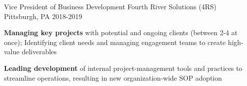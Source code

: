 \begin{cventries}
\cventry
    {Vice President of Business Development} %
    {Fourth River Solutions (4RS)} %
    {Pittsburgh, PA} %
    {2018-2019} %
    {
      \begin{cvitems} %
        \item {\textbf{Managing key projects} with potential and ongoing clients (between 2-4 at once); Identifying client needs and managing engagement teams to create high-value deliverables}
        \item {\textbf{Leading development} of internal project-management tools and practices to streamline operations, resulting in new organization-wide SOP adoption} 
      \end{cvitems}
    }
    \vspace*{-0.2cm}

\end{cventries}

